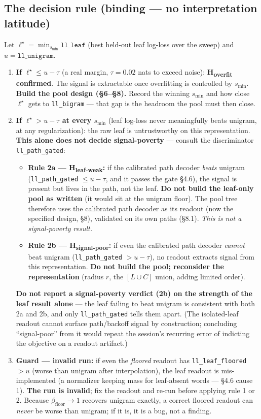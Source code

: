 \documentclass[11pt]{article}
\newcommand{\code}[1]{\texttt{#1}}
\begin{document}
\subsection{The decision rule (binding --- no interpretation latitude)}
Let $\ell^\star=\min_{s_{\min}} \code{ll\_leaf}$ (best held-out leaf log-loss over the sweep) and $u=\code{ll\_unigram}$.
\begin{enumerate}[nosep]
\item \textbf{If $\ell^\star \le u - \tau$} (a real margin, $\tau=0.02$ nats to exceed noise): \textbf{H\textsubscript{overfit} confirmed}. The signal is extractable once overfitting is controlled by $s_{\min}$. \textbf{Build the pool design (\S6--\S8).} Record the winning $s_{\min}$ and how close $\ell^\star$ gets to \code{ll\_bigram} --- that gap is the headroom the pool must then close.
\item \textbf{If $\ell^\star > u - \tau$ at every $s_{\min}$} (leaf log-loss never meaningfully beats unigram, at any regularization): the raw leaf is untrustworthy on this representation. \textbf{This alone does not decide signal-poverty} --- consult the discriminator \code{ll\_path\_gated}:
  \begin{itemize}[nosep]
  \item \textbf{Rule 2a --- H\textsubscript{leaf-weak}:} if the calibrated path decoder \emph{beats} unigram (\code{ll\_path\_gated} $\le u - \tau$, and it passes the gate \S4.6), the signal is present but lives in the path, not the leaf. \textbf{Do not build the leaf-only pool as written} (it would sit at the unigram floor). The pool tree therefore uses the calibrated path decoder as its readout (now the specified design, \S8), validated on its own paths (\S8.1). \emph{This is not a signal-poverty result.}
  \item \textbf{Rule 2b --- H\textsubscript{signal-poor}:} if even the calibrated path decoder \emph{cannot} beat unigram (\code{ll\_path\_gated} $> u - \tau$), no readout extracts signal from this representation. \textbf{Do not build the pool; reconsider the representation} (radius $r$, the $[L\cup C]$ union, adding limited order).
  \end{itemize}
  \textbf{Do not report a signal-poverty verdict (2b) on the strength of the leaf result alone} --- the leaf failing to beat unigram is consistent with both 2a and 2b, and only \code{ll\_path\_gated} tells them apart. (The isolated-leaf readout cannot surface path/backoff signal by construction; concluding ``signal-poor'' from it would repeat the session's recurring error of indicting the objective on a readout artifact.)
\item \textbf{Guard --- invalid run:} if even the \emph{floored} readout has \code{ll\_leaf\_floored} $>u$ (worse than unigram after interpolation), the leaf readout is mis-implemented (a normalizer keeping mass for leaf-absent words --- \S4.6 cause 1). \textbf{The run is invalid}; fix the readout and re-run before applying rule 1 or 2. Because $\beta_{\text{floor}}\to1$ recovers unigram exactly, a correct floored readout can \emph{never} be worse than unigram; if it is, it is a bug, not a finding.
\end{enumerate}
\end{document}

